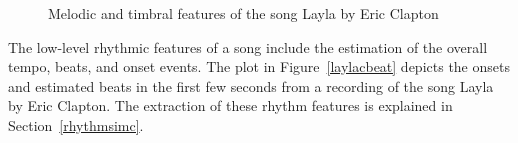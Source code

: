 \begin{figure}[htbp]
	\centering
	\caption{Melodic and timbral features of the song Layla by Eric Clapton}
	\label{fig:feat1}
\end{figure}

\noindent The low-level rhythmic features of a song include the estimation of the overall tempo, beats, and onset events. 
The plot in Figure~\ref{laylacbeat} depicts the onsets and estimated beats in the first few seconds from a recording of the song Layla by Eric Clapton. The extraction of these rhythm features is explained in Section~\ref{rhythmsimc}.

